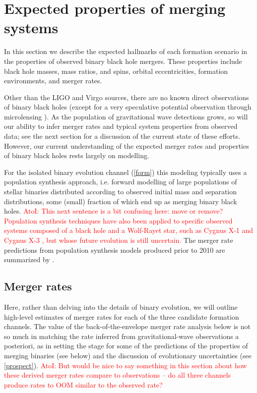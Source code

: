 \documentclass[iop,onecolumn]{revtex4}
\newcommand{\ajf}[1]{\textcolor{red}{AtoI: #1}}
\begin{document}
\section{Expected properties of merging systems}\label{merge}

In this section we describe the expected hallmarks of each formation scenario in the properties of observed binary black hole mergers. These properties include black hole masses, mass ratios, and spins, orbital eccentricities, formation environments, and merger rates.

Other than the LIGO and Virgo sources, there are no known direct observations of binary black holes (except for a very speculative potential observation through microlensing \citep{Dong:2007}). As the population of gravitational wave detections grows, so will our ability to infer merger rates and typical system properties from observed data; see the next section for a discussion of the current state of these efforts. However, our current understanding of the expected merger rates and properties of binary black holes rests largely on modelling. 

For the isolated binary evolution channel (\autoref{form}) this modeling typically uses a population synthesis approach, i.e. forward modelling of large populations of stellar binaries distributed according to observed initial mass and separation distributions, some (small) fraction of which end up as merging binary black holes. \ajf{This next sentence is a bit confusing here: move or remove? Population synthesis techniques have also been applied to specific observed systems composed of a black hole and a Wolf-Rayet star, such as Cygnus X-1 \citep{Bulik:2008} and Cygnus X-3 \citep{CygnusX3:2012}, but whose future evolution is still uncertain.}   The merger rate predictions from population synthesis models produced prior to 2010 are summarized by \citet{ratesdoc}.


\subsection{Merger rates}

 Here, rather than delving into the details of binary evolution, we will outline high-level estimates of merger rates for each of the three candidate formation channels. The value of the back-of-the-envelope merger rate analysis below is not so much in matching the rate inferred from gravitational-wave observations a posteriori, as in setting the stage for some of the predictions of the properties of merging binaries (see below) and the discussion of evolutionary uncertainties (see \autoref{prospect}). \ajf{But would be nice to say something in this section about how these derived merger rates compare to observations -- do all three channels produce rates to OOM similar to the observed rate?}
\end{document}
